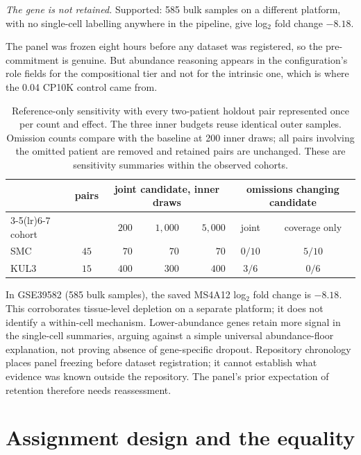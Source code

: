 \emph{The gene is not retained.} Supported: 585 bulk samples
on a different platform, with no single-cell labelling anywhere in the
pipeline, give log$_2$ fold change $-8.18$.

The panel was frozen eight hours before any dataset was registered, so the
pre-commitment is genuine. But abundance reasoning appears in the
configuration's role fields for the compositional tier and not for the
intrinsic one, which is where the 0.04 CP10K control came from.

\begin{table}[htbp]
\centering\small
\caption{Reference-only sensitivity with every two-patient holdout pair
represented once per count and effect. The three inner budgets reuse identical
outer samples. Omission counts compare with the baseline at 200 inner draws;
all pairs involving the omitted patient are removed and retained pairs are
unchanged. These are sensitivity summaries within the observed cohorts.}
\label{tab:sensitivity}
\begin{tabular}{@{}lcrrrcc@{}}
\toprule
 & pairs & \multicolumn{3}{c}{joint candidate, inner draws} &
 \multicolumn{2}{c}{omissions changing candidate} \\
\cmidrule(lr){3-5}\cmidrule(lr){6-7}
cohort & & $200$ & $1{,}000$ & $5{,}000$ & joint & coverage only \\
\midrule
SMC & $45$ & $70$ & $70$ & $70$ & $0/10$ & $5/10$ \\
KUL3 & $15$ & $400$ & $300$ & $400$ & $3/6$ & $0/6$ \\
\bottomrule
\end{tabular}
\end{table}

In GSE39582 (585 bulk samples), the saved MS4A12 log$_2$ fold change is
$-8.18$. This corroborates tissue-level depletion on a separate platform;
it does not identify a within-cell mechanism. Lower-abundance genes retain
more signal in the single-cell summaries, arguing against a simple universal
abundance-floor explanation, not proving absence of gene-specific dropout.
Repository chronology places panel freezing before dataset registration;
it cannot establish what evidence was known outside the repository. The
panel's prior expectation of retention therefore needs reassessment.

\section{Assignment design and the equality}
\label{app:design}

